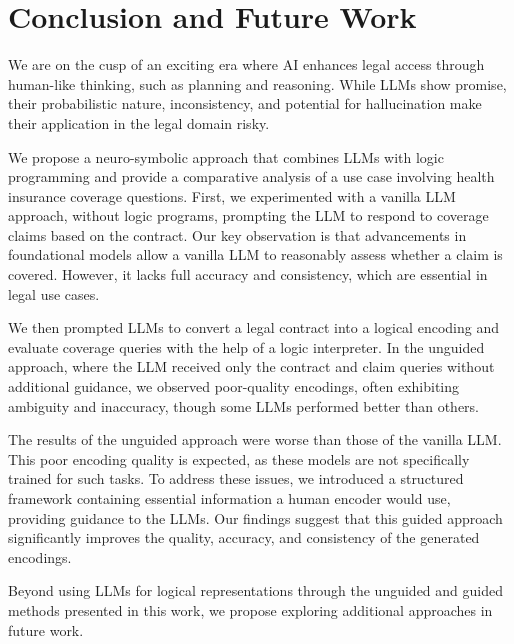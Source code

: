 \section{Conclusion and Future Work}
We are on the cusp of an exciting era where AI enhances legal access through human-like thinking, such as planning and reasoning. While LLMs show promise, their probabilistic nature, inconsistency, and potential for hallucination make their application in the legal domain risky. 

We propose a neuro-symbolic approach that combines LLMs with logic programming and provide a comparative analysis of a use case involving health insurance coverage questions. First, we experimented with a vanilla LLM approach, without logic programs, prompting the LLM to respond to coverage claims based on the contract. Our key observation is that advancements in foundational models allow a vanilla LLM to reasonably assess whether a claim is covered. However, it lacks full accuracy and consistency, which are essential in legal use cases.

We then prompted LLMs to convert a legal contract into a logical encoding and evaluate coverage queries with the help of a logic interpreter. In the unguided approach, where the LLM received only the contract and claim queries without additional guidance, we observed poor-quality encodings, often exhibiting ambiguity and inaccuracy, though some LLMs performed better than others. 

The results of the unguided approach were worse than those of the vanilla LLM. This poor encoding quality is expected, as these models are not specifically trained for such tasks. To address these issues, we introduced a structured framework containing essential information a human encoder would use, providing guidance to the LLMs. Our findings suggest that this guided approach significantly improves the quality, accuracy, and consistency of the generated encodings.

Beyond using LLMs for logical representations through the unguided and guided methods presented in this work, we propose exploring additional approaches in future work.

